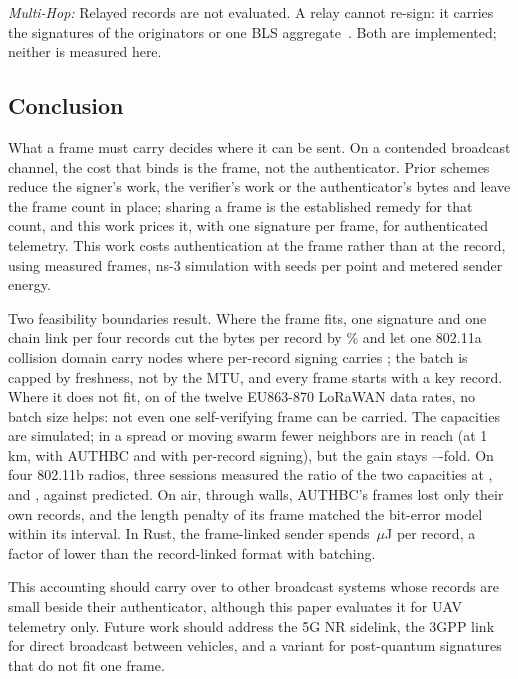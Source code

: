 \documentclass[lineno,pdflatex,sn-mathphys-num]{sn-jnl}
\newcommand{\runin}[1]{\textit{#1:}}
\renewcommand{\_}{\authbcunderscore\allowbreak}
\begin{document}
\runin{Multi-Hop} Relayed records are not evaluated. A relay cannot re-sign: it carries the
signatures of the originators or one BLS aggregate~\cite{bgls2003}. Both are implemented; neither
is measured here.

\subsection{Conclusion}
What a frame must carry decides where it can be sent. On a contended broadcast channel, the cost
that binds is the frame, not the authenticator. Prior schemes reduce the signer's work, the
verifier's work or the authenticator's bytes and leave the frame count in place; sharing a frame
is the established remedy for that count, and this work prices it, with one signature per frame,
for authenticated telemetry. This work costs authentication at the frame rather
than at the record, using measured frames, ns-3 simulation with \seeds{} seeds per point and
metered sender energy.

Two feasibility boundaries result. Where the frame fits, one signature and one chain link per
four records cut the bytes per record by \saveLean\% and let one 802.11a collision domain carry
\nmaxLeanDesign{} nodes where per-record signing carries \nmaxLeanBase; the batch is capped by
freshness, not by the MTU, and every frame starts with a key record. Where it does not fit,
on \exclCount{} of the twelve EU863-870 LoRaWAN data rates, no batch size helps: not even one
self-verifying frame can be carried. The capacities are simulated; in a spread or moving swarm fewer neighbors are in
reach (at 1\,km, \spNeighbours{} with AUTHBC and \spNeighboursBase{} with per-record signing),
but the gain stays \spRatioLo--\mvRatioHi-fold. On four 802.11b radios, three sessions measured the
ratio of the two capacities at \hwRatio, \hwRepeatRatio{} and \hwThirdRatio, against \hwModelRatio{}
predicted.
On air, through walls, AUTHBC's frames lost only their own records, and the length penalty of its
frame matched the bit-error model within its interval. In Rust, the frame-linked sender spends \enRustMeas\,$\mu$J per record,
a factor of \enFirstOverRust{} lower than the record-linked format with batching.

This accounting should carry over to other broadcast systems whose records are small beside
their authenticator, although this paper evaluates it for UAV telemetry only. Future work should
address the 5G NR sidelink, the 3GPP link for direct broadcast between vehicles, and a variant
for post-quantum signatures that do not fit one frame.
\end{document}
